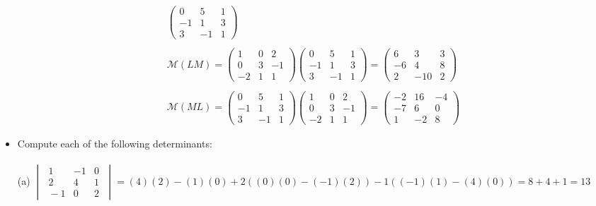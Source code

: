 \documentclass[10pt]{extarticle}
\newcommand{\itembf}[1]{\item[\textbf{#1}]}
\begin{document}
\begin{itemize}
\begin{gather*}
\begin{pmatrix}
				     0 & 5 & 1\\
					-1 & 1 & 3\\
				     3 & -1 & 1
				\end{pmatrix}
				\\
				\\
				\mathcal{M}(LM)=
				\begin{pmatrix}
					1 & 0 & 2\\
					0 & 3 & -1\\
					-2 & 1 & 1
				\end{pmatrix}	
				\begin{pmatrix}
					0 & 5 & 1\\
					-1 & 1 & 3\\
					3 & -1 & 1
				\end{pmatrix}
				=\begin{pmatrix}
				    6 & 3 & 3 \\
				   -6 & 4 & 8\\
					2 & -10 & 2
				\end{pmatrix}
				\\
				\\
				\mathcal{M}(ML)=
				\begin{pmatrix}
					0 & 5 & 1\\
					-1 & 1 & 3\\
					3 & -1 & 1
				\end{pmatrix}
				\begin{pmatrix}
				1 & 0 & 2\\
				0 & 3 & -1\\
				-2 & 1 & 1
				\end{pmatrix}
				=\begin{pmatrix}
					-2 & 16 & -4 \\
					-7 & 6 & 0\\
					1 & -2 & 8
				\end{pmatrix}
			\end{gather*}
		
		\itembf{8.} Compute each of the following determinants:
		\\
		\\
		(a) $\begin{vmatrix}
				\;1 & -1 & 0 \;\\
				\;	2 & 4 & 1 \; \\
				\;	-1 & 0 & 2\;
			\end{vmatrix}
			=(4)(2)-(1)(0)+2((0)(0)-(-1)(2))-1((-1)(1)-(4)(0))=8+4+1=13$\\ \\
		

\end{itemize}
\end{document}
